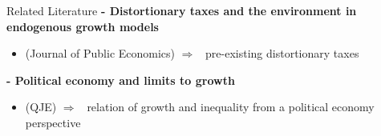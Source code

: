 \documentclass[11pt,aspectratio=169]{beamer}
\newcommand{\ar}{$\Rightarrow$ \ }
\begin{document}
\begin{frame}{Related Literature }
\textbf{- Distortionary taxes and the environment in endogenous growth models}
\begin{itemize}
	\item \cite{Bovenberg1997EnvironmentalGrowth}(Journal of Public Economics) \ar pre-existing distortionary taxes
\end{itemize}

\textbf{ - Political economy and limits to growth}
\begin{itemize}
\item \cite{Alesina1994DistributiveGrowth}(QJE)
\ar relation of growth and inequality from a political economy perspective
\end{itemize}


\end{frame}
\end{document}
